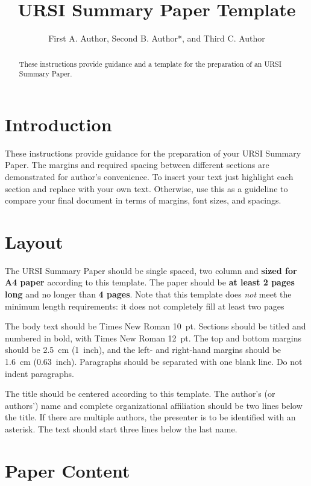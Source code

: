 \documentclass[summary]{ursi}
\title{URSI Summary Paper Template}
\author{First A. Author\affref{ref1}, Second B. Author*\affref{ref1},
  and Third C. Author\affref{ref2}}
\affiliation{%
  \aff{ref1}{ABC University, Prague, Czechia; e-mail: FAA@seznam.cz; SBA@email.cz}
  \aff{ref2}{The Next University, Neverland, USA; e-mail: TCA@gmail.com}
}
\begin{document}
\maketitle

\begin{abstract}
  These instructions provide guidance and a template for
  the preparation of an URSI Summary Paper.
\end{abstract}

\section{Introduction}

These instructions provide guidance for the preparation of your URSI Summary
Paper. The margins and required spacing between different
sections are demonstrated for author's convenience. To insert your text
just highlight each section and replace with your own text. Otherwise, use
this as a guideline to compare your final document in terms of margins,
font sizes, and spacings.

\section{Layout}


The URSI Summary Paper should be single spaced, two column and
\textbf{sized for A4 paper} according to this template. The paper should be
\textbf{at least 2 pages long} and no longer than \textbf{4 pages}. Note
that this template does \emph{not} meet the minimum length requirements: it
does not completely fill at least two pages

The body text should be Times New Roman 10~pt. Sections should be titled
and numbered in bold, with Times New Roman 12~pt. The top and bottom
margins should be 2.5~cm (1~inch), and the left- and right-hand margins
should be 1.6~cm (0.63~inch). Paragraphs should be separated with one blank
line. Do not indent paragraphs.

The title should be centered according to this template. The author's (or
authors') name and complete organizational affiliation should be two lines
below the title. If there are multiple authors, the presenter is to be
identified with an asterisk. The text should start three lines below the
last name.


\section{Paper Content}
\end{document}
